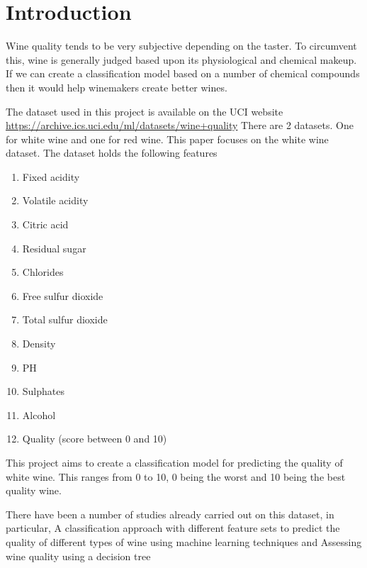 \section{Introduction}

Wine quality tends to be very subjective depending on the taster. To circumvent this, wine is generally judged based upon its physiological and chemical makeup. If we can create a classification model based on a number of chemical compounds then it would help winemakers create better wines. 

The dataset used in this project is available on the UCI website \url{https://archive.ics.uci.edu/ml/datasets/wine+quality} There are 2 datasets. One for white wine and one for red wine. This paper focuses on the white wine dataset. The dataset holds the following features

\begin{enumerate}
  \item Fixed acidity 
  \item Volatile acidity
  \item Citric acid 
  \item Residual sugar 
  \item Chlorides
  \item Free sulfur dioxide 
  \item Total sulfur dioxide 
  \item Density
  \item PH
  \item Sulphates
  \item Alcohol
  \item Quality (score between 0 and 10)
\end{enumerate}

This project aims to create a classification model for predicting the quality of white wine. This ranges from 0 to 10, 0 being the worst and 10 being the best quality wine.

There have been a number of studies already carried out on this dataset, in particular, A classification approach with different feature sets to predict the quality of different types of wine using machine learning techniques\cite{8323674} and Assessing wine quality using a decision tree\cite{7302752}
